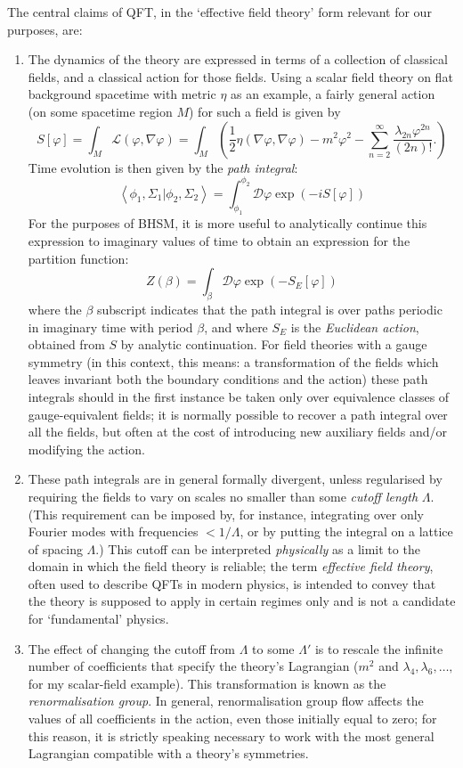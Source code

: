 \documentclass[12pt]{article}
\newcommand{\mc}[1]{\ensuremath{\mathcal{#1}}}
\newcommand{\bk}[2]{\ensuremath{\left\langle #1 | #2 \right\rangle}}
\newcommand{\be}{\begin{equation}}
\newcommand{\ee}{\end{equation}}
\begin{document}
The central claims of QFT, in the `effective field theory' form relevant for our purposes, are:
\begin{enumerate}
\item The dynamics of the theory are expressed in terms of a collection of classical fields, and a classical action for those fields. Using a scalar field theory on flat background spacetime with metric $\eta$ as an example, a fairly general action (on some spacetime region $M$) for such a field is given by 
\be
S[\varphi] = \int_M \mc{L}(\varphi, \nabla \varphi) = \int_M \left(\frac{1}{2}\eta (\nabla \varphi,\nabla \varphi) - m^2 \varphi^2 - \sum_{n=2}^\infty \frac{\lambda_{2n}\varphi^{2n}}{(2n)!}. \right)
\ee
Time evolution is then given by the \emph{path integral}:
\be \label{pathintegral}
\bk{\phi_1,\Sigma_1}{\phi_2,\Sigma_2} = \int^{\phi_2}_{\phi_1} \mc{D}\varphi \exp (-i S[\varphi])
\ee
For the purposes of BHSM, it is more useful to analytically continue this expression to imaginary values of time to obtain an expression for the partition function:
\be
Z(\beta) = \int_\beta \mc{D}\varphi \exp (-S_E[\varphi])
\ee
where the $\beta$ subscript indicates that the path integral is over paths periodic in imaginary time with period $\beta$, and where $S_E$ is the \emph{Euclidean action}, obtained from $S$ by analytic continuation. For field theories with a gauge symmetry (in this context, this means: a transformation of the fields which leaves invariant both the boundary conditions and the action) these path integrals should in the first instance be taken only over equivalence classes of gauge-equivalent fields; it is normally possible to recover a path integral over all the fields, but often at the cost of introducing new auxiliary fields and/or modifying the action.
\item These path integrals are in general formally divergent, unless regularised by requiring the fields to vary on scales no smaller than some \emph{cutoff length} $\Lambda$. (This requirement can be imposed by, for instance, integrating over only Fourier modes with frequencies $<1/\Lambda$, or by putting the integral on a lattice of spacing $\Lambda$.) This cutoff can be interpreted \emph{physically} as a limit to the domain in which the field theory is reliable; the term \emph{effective field theory}, often used to describe QFTs in modern physics, is intended to convey that the theory is supposed to apply in certain regimes only and is not a candidate for `fundamental' physics. 
\item The effect of changing the cutoff from $\Lambda$ to some $\Lambda'$ is to rescale the infinite number of coefficients that specify the theory's Lagrangian ($m^2$ and $\lambda_4, \lambda_6, \ldots,$ for my scalar-field example). This transformation is known as the \emph{renormalisation group}. In general, renormalisation group flow affects the values of all coefficients in the action, even those initially equal to zero; for this reason, it is strictly speaking necessary to work with the most general Lagrangian compatible with a theory's symmetries. 

\end{enumerate}
\end{document}
